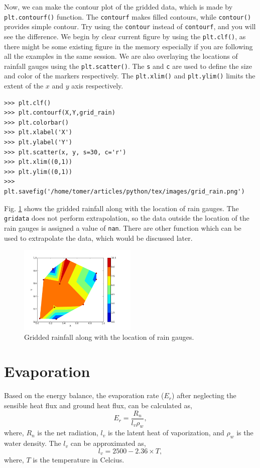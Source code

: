\documentclass[10pt]{book}
\begin{document}
{Now, we can make the contour plot of the gridded data, which is made by \verb"plt.contourf()" function. The \verb"contourf" makes filled contours, while \verb"contour()" provides simple contour. Try using the \verb"contour" instead of \verb"contourf", and you will see the difference. We begin by clear current figure by using the \verb"plt.clf()", as there might be some existing figure in the memory especially if you are following all the examples in the same session. We are also overlaying the locations of rainfall gauges using the \verb"plt.scatter()". The \verb"s" and \verb"c" are used to define the size and color of the markers respectively. The \verb"plt.xlim()" and \verb"plt.ylim()" limits the extent of the $x$ and $y$ axis respectively. 
\beforeverb \begin{verbatim}
>>> plt.clf()
>>> plt.contourf(X,Y,grid_rain)
>>> plt.colorbar()
>>> plt.xlabel('X')
>>> plt.ylabel('Y')
>>> plt.scatter(x, y, s=30, c='r')
>>> plt.xlim((0,1))
>>> plt.ylim((0,1))
>>> plt.savefig('/home/tomer/articles/python/tex/images/grid_rain.png')
\end{verbatim} \afterverb
{}

Fig. \ref{fig:grid_rain} shows the gridded rainfall along with the location of rain gauges. The \verb"gridata" does not perform extrapolation, so the data outside the location of the rain gauges is assigned a value of \verb"nan". There are other function which can be used to extrapolate the data, which would be discussed later. 

\beforefig
\begin{figure}[h!]
  \centering
    \includegraphics[width=0.5\textwidth]{images/grid_rain.png}
  \caption{Gridded rainfall along with the location of rain gauges.}
   \label{fig:grid_rain}
\end{figure}
\afterfig

\section{Evaporation}
Based on the energy balance, the evaporation rate  ($E_r$) after neglecting the sensible heat flux and ground heat flux, can be calculated as,
\begin{equation}
E_r = \frac{R_n}{l_v\rho_w},
\end{equation}
where, $R_n$ is the net radiation, $l_v$ is the latent heat of vaporization, and $\rho_w$ is the water density. The $l_v$ can be approximated as,
\begin{equation}
l_v = 2500 - 2.36\times T,
\end{equation}
where, $T$ is the temperature in Celcius. \\


}
\end{document}
